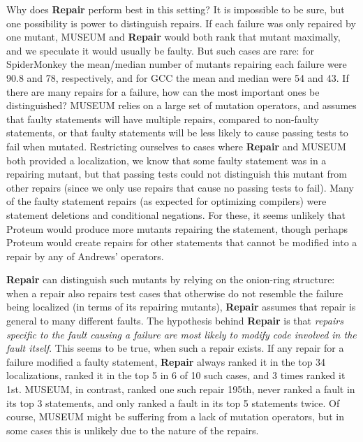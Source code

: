  Why does {\bf Repair} perform best in this setting?  It is impossible to be sure, but one  possibility is power to distinguish repairs. If each failure was only repaired by one mutant, MUSEUM and {\bf Repair} would both rank that mutant maximally, and we speculate it would usually be faulty.  But such cases are rare:  for SpiderMonkey the mean/median number of mutants repairing each failure were 90.8 and 78, respectively, and for GCC the mean and median were 54 and 43.  If there are many repairs for a failure, how can the most important ones be distinguished?  MUSEUM relies on a large set of mutation operators, and assumes that faulty statements will have multiple repairs, compared to non-faulty statements, or that faulty statements will be less likely to cause passing tests to fail when mutated.  Restricting ourselves to cases where {\bf Repair} and MUSEUM both provided a localization, we know that some faulty statement was in a repairing mutant, but that passing tests could not distinguish this mutant  from other repairs (since we only use repairs that cause no passing tests to fail).  Many of the faulty statement repairs (as expected for optimizing compilers) were statement deletions and conditional negations.  For these, it seems unlikely that Proteum would produce more mutants repairing the statement, though perhaps Proteum would create repairs for other statements that cannot be modified into a repair by any of Andrews' operators.  

{\bf Repair} can distinguish such mutants by relying on the onion-ring structure:  when a repair also repairs test cases that otherwise do not resemble the failure being localized (in terms of its repairing mutants), {\bf Repair} assumes that repair is general to many different faults.  The hypothesis behind {\bf Repair} is that \emph{repairs specific to the fault causing a failure are most likely to modify code involved in the fault itself}.  This seems to be true, when such a repair exists.  If any repair for a failure modified a faulty statement, {\bf Repair} always ranked it in the top 34 localizations, ranked it in the top 5 in 6 of 10 such cases, and 3 times ranked it 1st.  MUSEUM, in contrast, ranked one such repair 195th, never ranked a fault in its top 3 statements, and only ranked a fault in its top 5 statements twice.  Of course, MUSEUM might be suffering from a lack of mutation operators, but in some cases this is unlikely due to the nature of the repairs.


